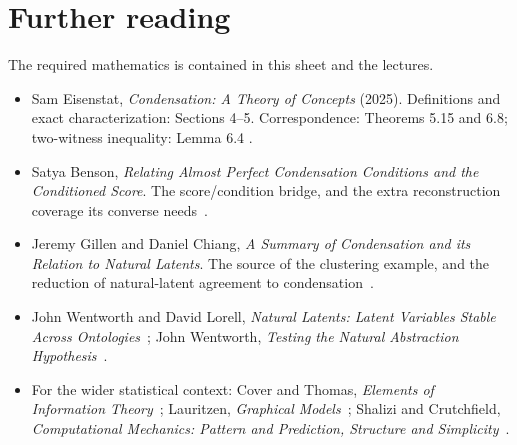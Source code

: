 \documentclass[11pt]{article}
\begin{document}
\section{Further reading}
\label{sec:further-reading}
The required mathematics is contained in this sheet and the lectures.
\begin{itemize}
\item Sam Eisenstat, \emph{Condensation: A Theory of Concepts} (2025).
Definitions and exact characterization: Sections 4--5. Correspondence:
Theorems 5.15 and 6.8; two-witness inequality: Lemma 6.4
\citep{eisenstat2025condensation}.
\item Satya Benson, \emph{Relating Almost Perfect Condensation Conditions and
the Conditioned Score}. The score/condition bridge, and the extra
reconstruction coverage its converse needs~\citep{benson2026relating}.
\item Jeremy Gillen and Daniel Chiang, \emph{A Summary of Condensation and its
Relation to Natural Latents}. The source of the clustering example, and the
reduction of natural-latent agreement to condensation~\citep{gillen2026summary}.
\item John Wentworth and David Lorell, \emph{Natural Latents: Latent Variables
Stable Across Ontologies}~\citep{wentworth2025natural}; John Wentworth,
\emph{Testing the Natural Abstraction Hypothesis}~\citep{wentworth2021testing}.
\item For the wider statistical context: Cover and Thomas,
\emph{Elements of Information Theory}~\citep{cover2006elements}; Lauritzen,
\emph{Graphical Models}~\citep{lauritzen1996graphical}; Shalizi and
Crutchfield, \emph{Computational Mechanics: Pattern and Prediction, Structure
and Simplicity}~\citep{shalizi2001computational}.
\end{itemize}



\end{document}
